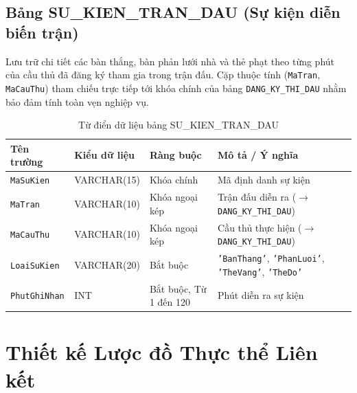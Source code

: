 \subsection{Bảng SU\_KIEN\_TRAN\_DAU (Sự kiện diễn biến trận)}
Lưu trữ chi tiết các bàn thắng, bàn phản lưới nhà và thẻ phạt theo từng phút của cầu thủ đã đăng ký tham gia trong trận đấu. Cặp thuộc tính (\texttt{MaTran}, \texttt{MaCauThu}) tham chiếu trực tiếp tới khóa chính của bảng \texttt{DANG\_KY\_THI\_DAU} nhằm bảo đảm tính toàn vẹn nghiệp vụ.
\begin{table}[H]
\centering
\small
\begin{tabular}{|l|l|l|p{6cm}|}
\hline
\textbf{Tên trường} & \textbf{Kiểu dữ liệu} & \textbf{Ràng buộc} & \textbf{Mô tả / Ý nghĩa} \\ \hline
\texttt{MaSuKien} & VARCHAR(15) & Khóa chính & Mã định danh sự kiện \\ \hline
\texttt{MaTran} & VARCHAR(10) & Khóa ngoại kép & Trận đấu diễn ra ($\rightarrow$ \texttt{DANG\_KY\_THI\_DAU}) \\ \hline
\texttt{MaCauThu} & VARCHAR(10) & Khóa ngoại kép & Cầu thủ thực hiện ($\rightarrow$ \texttt{DANG\_KY\_THI\_DAU}) \\ \hline
\texttt{LoaiSuKien} & VARCHAR(20) & Bắt buộc & \texttt{'BanThang'}, \texttt{'PhanLuoi'}, \texttt{'TheVang'}, \texttt{'TheDo'} \\ \hline
\texttt{PhutGhiNhan} & INT & Bắt buộc, Từ 1 đến 120 & Phút diễn ra sự kiện \\ \hline
\end{tabular}
\caption{Từ điển dữ liệu bảng SU\_KIEN\_TRAN\_DAU}
\end{table}

\section{Thiết kế Lược đồ Thực thể Liên kết}

